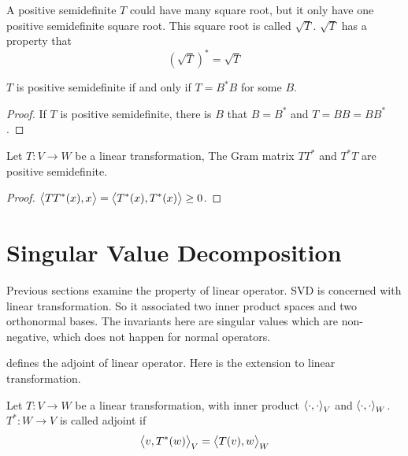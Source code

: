 \begin{definition}[$\sqrt{T}$]
   A positive semidefinite $T$ could have many square root, but it only have one positive semidefinite square root. This square root is called $\sqrt{T}$. $\sqrt{T}$ has a property that
   \begin{equation}
       \left(\sqrt{T}\right)^* = \sqrt{T}
   \end{equation}   
\end{definition}


\begin{theorem}
    $T$ is positive semidefinite if and only if $T = B^*B$ for some $B$.    
\end{theorem}
\begin{proof}
    If $T$ is positive semidefinite, there is $B$ that $B = B^*$ and $T = BB = BB^*$.
\end{proof}


\begin{theorem}\label{tt_positive_semidefinite}
    Let $T:V \rightarrow W$ be a linear transformation, The Gram matrix $TT^*$ and $T^*T$ are positive semidefinite.
\end{theorem}
\begin{proof}
    $\left\langle \displaystyle TT^*(x), x \right\rangle = \left\langle \displaystyle T^*(x), T^*(x) \right\rangle \geq 0$.
\end{proof}



\section{Singular Value Decomposition}

Previous sections examine the property of linear operator. SVD is concerned with linear transformation. So it associated two inner product spaces and two orthonormal bases. The invariants here are singular values which are non-negative, which does not happen for normal operators.

\begin{definition}
     defines the adjoint of linear operator. Here is the extension to linear transformation.
    
    Let $T:V \rightarrow W$ be a linear transformation, with inner product $\left\langle \displaystyle \cdot, \cdot \right\rangle_V$ and $\left\langle \displaystyle \cdot, \cdot \right\rangle_W$. $T^*: W \rightarrow V$ is called adjoint if 
    \begin{equation}
        \left\langle \displaystyle v, T^*(w) \right\rangle_V = \left\langle \displaystyle T(v), w \right\rangle_W
    \end{equation}
\end{definition}

